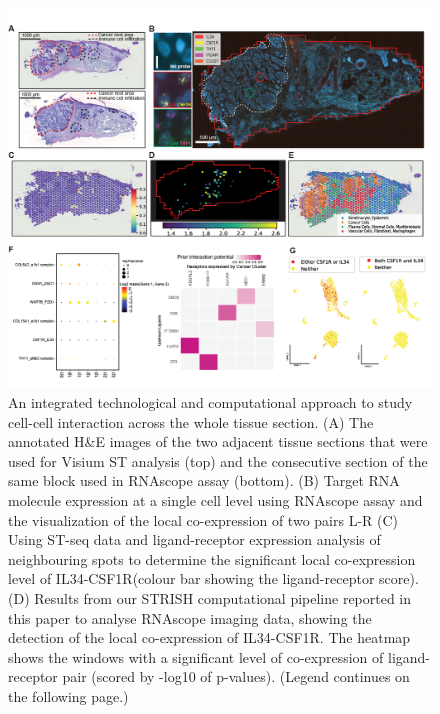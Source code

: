 \begin{figure}[htp]
    \centering
    \includegraphics[width=\columnwidth]{Chapter2/Figures/Chapter2_Result_figure1.png}
    \caption[An integrated technological and computational approach to study cell-cell interaction across the whole tissue section.]{ An integrated technological and computational approach to study cell-cell interaction across the whole tissue section. (A) The annotated H\&E images of the two adjacent tissue sections that were used for Visium ST analysis (top) and the consecutive section of the same block used in RNAscope assay (bottom). (B) Target RNA molecule expression at a single cell level using RNAscope assay and the visualization of the local co-expression of two pairs L-R (C) Using ST-seq data and ligand-receptor expression analysis of neighbouring spots to determine the significant local co-expression level of IL34-CSF1R(colour bar showing the ligand-receptor score). (D) Results from our STRISH computational pipeline reported in this paper to analyse RNAscope imaging data, showing the detection of the local co-expression of IL34-CSF1R. The heatmap shows the windows with a significant level of co-expression of ligand-receptor pair (scored by -log10 of p-values). (Legend continues on the following page.)}
    \label{fig:Chap2_figure1_result}
\end{figure}
\begin{figure}[t]
\end{figure}
